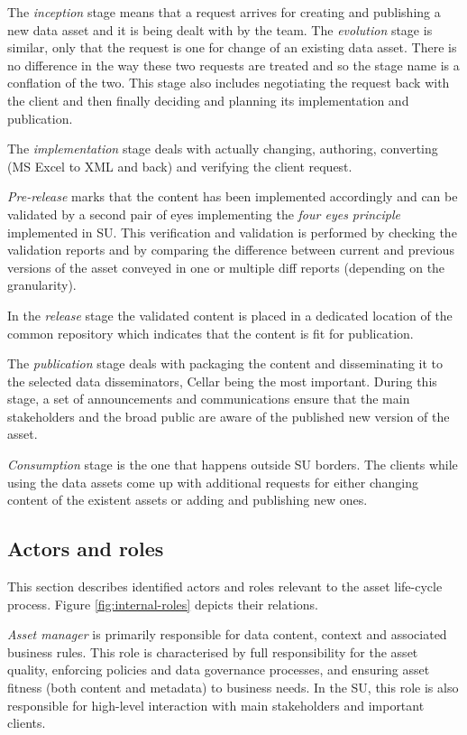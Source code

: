 	The \textit{inception} stage means that a request arrives for creating and publishing a new data asset and it is being dealt with by the team. The \textit{evolution} stage is similar, only that the request is one for change of an existing data asset. There is no difference in the way these two requests are treated and so the stage name is a conflation of the two. This stage also includes negotiating the request back with the client and then finally deciding and planning its implementation and publication. 
	
	The \textit{implementation} stage deals with actually changing, authoring, converting (MS Excel to XML and back) and verifying the client request. 
	
	\textit{Pre-release} marks that the content has been implemented accordingly and can be validated by a second pair of eyes implementing the \textit{four eyes principle} implemented in SU. This verification and validation is performed by checking the validation reports and by comparing the difference between current and previous versions of the asset conveyed in one or multiple diff reports (depending on the granularity).
	
	In the \textit{release} stage the validated content is placed in a dedicated location of the common repository which indicates that the content is fit for publication. 
	
	The \textit{publication} stage deals with packaging the content and disseminating it to the selected data disseminators, Cellar being the most important. During this stage, a set of announcements and communications ensure that the main stakeholders and the broad public are aware of the published new version of the asset. 
	
	\textit{Consumption} stage is the one that happens outside SU borders. The clients while using the data assets come up with additional requests for either changing content of the existent assets or adding and publishing new ones. 
	
	\subsection{Actors and roles}
	\label{sec:lifecycle-roles}	
	
	This section describes identified actors and roles relevant to the asset life-cycle process. Figure \ref{fig:internal-roles} depicts their relations.
		
	\textit{Asset manager} is primarily responsible for data content, context and associated business rules. This role is characterised by full responsibility for the asset quality, enforcing policies and data governance processes, and ensuring asset fitness (both content and metadata) to business needs. In the SU, this role is also responsible for high-level interaction with main stakeholders and important clients.
	
